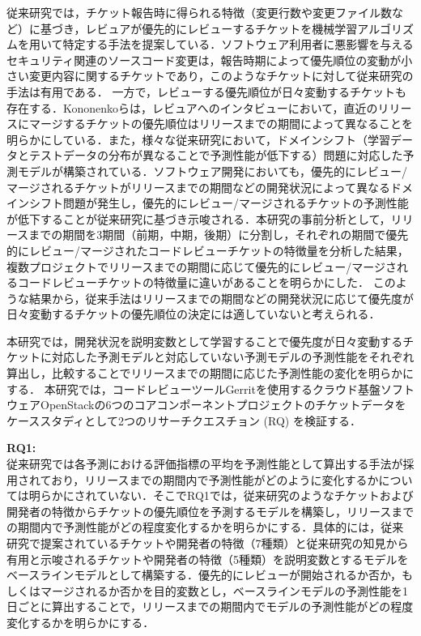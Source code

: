 \documentclass[submit]{ipsj}
\begin{document}
従来研究では，チケット報告時に得られる特徴（変更行数や変更ファイル数など）に基づき，レビュアが優先的にレビューするチケットを機械学習アルゴリズムを用いて特定する手法を提案している\cite{prioritizer}\cite{review_prioritize_pineapple}．ソフトウェア利用者に悪影響を与えるセキュリティ関連のソースコード変更は，報告時期によって優先順位の変動が小さい変更内容に関するチケットであり，このようなチケットに対して従来研究の手法は有用である．
一方で，レビューする優先順位が日々変動するチケットも存在する．Kononenkoらは，レビュアへのインタビューにおいて，直近のリリースにマージするチケットの優先順位はリリースまでの期間によって異なることを明らかにしている\cite{release_merge}．また，様々な従来研究において，ドメインシフト（学習データとテストデータの分布が異なることで予測性能が低下する）問題に対応した予測モデルが構築されている\cite{domain1}\cite{domain2}．ソフトウェア開発においても，優先的にレビュー/マージされるチケットがリリースまでの期間などの開発状況によって異なるドメインシフト問題が発生し，優先的にレビュー/マージされるチケットの予測性能が低下することが従来研究\cite{release_merge}に基づき示唆される．本研究の事前分析として，リリースまでの期間を3期間（前期，中期，後期）に分割し，それぞれの期間で優先的にレビュー/マージされたコードレビューチケットの特徴量を分析した結果，複数プロジェクトでリリースまでの期間に応じて優先的にレビュー/マージされるコードレビューチケットの特徴量に違いがあることを明らかにした．
このような結果から，従来手法はリリースまでの期間などの開発状況に応じて優先度が日々変動するチケットの優先順位の決定には適していないと考えられる．

本研究では，開発状況を説明変数として学習することで優先度が日々変動するチケットに対応した予測モデルと対応していない予測モデルの予測性能をそれぞれ算出し，比較することでリリースまでの期間に応じた予測性能の変化を明らかにする．
本研究では，コードレビューツールGerritを使用するクラウド基盤ソフトウェアOpenStackの6つのコアコンポーネントプロジェクトのチケットデータをケーススタディとして2つのリサーチクエスチョン (RQ) を検証する．

\noindent\textbf{RQ1: \rqone}\\
従来研究\cite{prioritizer}では各予測における評価指標の平均を予測性能として算出する手法が採用されており，リリースまでの期間内で予測性能がどのように変化するかについては明らかにされていない．そこでRQ1では，従来研究\cite{prioritizer}のようなチケットおよび開発者の特徴からチケットの優先順位を予測するモデルを構築し，リリースまでの期間内で予測性能がどの程度変化するかを明らかにする．具体的には，従来研究\cite{prioritizer}で提案されているチケットや開発者の特徴（7種類）と従来研究\cite{release_merge}\cite{review1}の知見から有用と示唆されるチケットや開発者の特徴（5種類）を説明変数とするモデルをベースラインモデルとして構築する．優先的にレビューが開始されるか否か，もしくはマージされるか否かを目的変数とし，ベースラインモデルの予測性能を1日ごとに算出することで，リリースまでの期間内でモデルの予測性能がどの程度変化するかを明らかにする．
\end{document}
